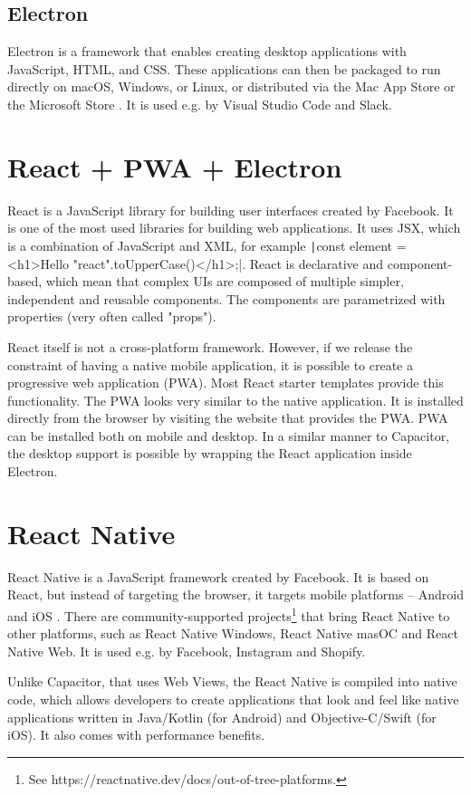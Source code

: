 \documentclass[
  digital, %
  table,   %
  oneside, %
  lof,     %
  lot,     %
]{fithesis3}
\newcommand{\code}[1]{\texttt|#1|} %
\begin{document}
\subsection{Electron}
Electron is a framework that enables creating desktop applications with JavaScript, HTML, and CSS. These applications can then be packaged to run directly on macOS, Windows, or Linux, or distributed via the Mac App Store or the Microsoft Store \cite{WhatIsElectron}. It is used e.g. by Visual Studio Code and Slack.

\section{React + PWA + Electron}
React is a JavaScript library for building user interfaces created by Facebook. It is one of the most used libraries for building web applications. It uses JSX, which is a combination of JavaScript and XML, for example \code{const element = <h1>Hello {"react".toUpperCase()}</h1>;}. React is declarative and component-based, which mean that complex UIs are composed of multiple simpler, independent and reusable components. The components are parametrized with properties (very often called "props").

React itself is not a cross-platform framework. However, if we release the constraint of having a native mobile application, it is possible to create a progressive web application (PWA). Most React starter templates provide this functionality. The PWA looks very similar to the native application. It is installed directly from the browser by visiting the website that provides the PWA. PWA can be installed both on mobile and desktop.
In a similar manner to Capacitor, the desktop support is possible by wrapping the React application inside Electron. 

\section{React Native}
React Native is a JavaScript framework created by Facebook. It is based on React, but instead of targeting the browser, it targets mobile platforms -- Android and iOS \cite{eisenman2015learning}. There are community-supported projects\footnote{See https://reactnative.dev/docs/out-of-tree-platforms.} that bring React Native to other platforms, such as React Native Windows, React Native masOC and React Native Web. It is used e.g. by Facebook, Instagram and Shopify. 

Unlike Capacitor, that uses Web Views, the React Native is compiled into native code, which allows developers to create applications that
look and feel like native applications written in Java/Kotlin (for Android) and Objective-C/Swift (for iOS). It also comes with performance benefits. 
\end{document}
